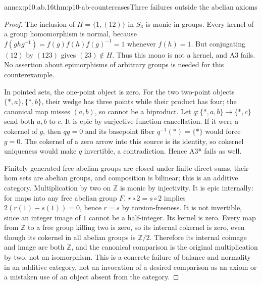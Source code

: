 \begin{annexitem}{annex:p10.ab.16}{thm:p10-ab-countercases}{Three failures outside the abelian axioms}
\begin{proof}
The inclusion of \(H=\{1,(12)\}\) in \(S_3\) is monic in groups.
Every kernel of a group homomorphism is normal, because
\(f(ghg^{-1})=f(g)f(h)f(g)^{-1}=1\) whenever \(f(h)=1\).
But conjugating \((12)\) by \((123)\) gives \((23)\notin H\).
Thus this mono is not a kernel, and A3 fails. No assertion about
epimorphisms of arbitrary groups is needed for this counterexample.

In pointed sets, the one-point object is zero. For the two two-point
objects \(\{*,a\},\{*,b\}\), their wedge has three points while
their product has four; the canonical map misses \((a,b)\), so cannot
be a biproduct. Let \(q:\{*,a,b\}\to\{*,c\}\) send both \(a,b\)
to \(c\). It is epic by surjective-function cancellation. If it were
a cokernel of \(g\), then \(qg=0\) and its basepoint fiber
\(q^{-1}(*)=\{*\}\) would force \(g=0\). The cokernel of a zero
arrow into this source is its identity, so cokernel uniqueness would
make \(q\) invertible, a contradiction. Hence A3* fails as well.

Finitely generated free abelian groups are closed under finite direct
sums, their hom sets are abelian groups, and composition is bilinear;
this is an additive category. Multiplication by two on \(\mathbb Z\)
is monic by injectivity. It is epic internally: for maps into any free
abelian group \(F\), \(r\circ2=s\circ2\) implies
\(2(r(1)-s(1))=0\), hence \(r=s\) by torsion-freeness.
It is not invertible, since an integer image of \(1\) cannot be a
half-integer. Its kernel is zero. Every map from \(\mathbb Z\) to
a free group killing two is zero, so its internal cokernel is zero,
even though its cokernel in all abelian groups is \(\mathbb Z/2\).
Therefore its internal coimage and image are both \(\mathbb Z\),
and the canonical comparison is the original multiplication by two,
not an isomorphism. This is a concrete failure of balance and normality
in an additive category, not an invocation of a desired comparison as
an axiom or a mistaken use of an object absent from the category.
\end{proof}
\end{annexitem}


